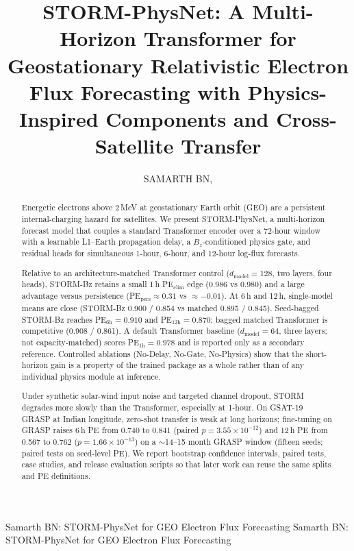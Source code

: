 \documentclass{ieeeaccess}
\begin{document}

\title{STORM-PhysNet: A Multi-Horizon Transformer for Geostationary Relativistic Electron Flux Forecasting with Physics-Inspired Components and Cross-Satellite Transfer}

\author{\uppercase{Samarth BN},
}
\address[1]{RV College of Engineering, Bengaluru, India (e-mail: samarthbn.ec25@rvce.edu.in)}
\markboth
{Samarth BN: STORM-PhysNet for GEO Electron Flux Forecasting}
{Samarth BN: STORM-PhysNet for GEO Electron Flux Forecasting}

\begin{abstract}
Energetic electrons above 2\,MeV at geostationary Earth orbit (GEO)
are a persistent internal-charging hazard for satellites. We present
STORM-PhysNet, a multi-horizon forecast model that couples a standard
Transformer encoder over a 72-hour window with a learnable L1--Earth
propagation delay, a \(B_z\)-conditioned physics gate, and residual
heads for simultaneous 1-hour, 6-hour, and 12-hour log-flux
forecasts.

Relative to an architecture-matched Transformer control
($d_{\mathrm{model}}=128$, two layers, four heads), STORM-Bz retains a small
1\,h PE$_{\mathrm{clim}}$ edge (0.986 vs 0.980) and a large advantage versus
persistence (PE$_{\mathrm{pers}} \approx 0.31$ vs $\approx -0.01$). At 6\,h and 12\,h, single-model
means are close (STORM-Bz 0.900 / 0.854 vs matched 0.895 / 0.845).
Seed-bagged STORM-Bz reaches PE$_{6\mathrm{h}} = 0.910$ and PE$_{12\mathrm{h}} = 0.870$;
bagged matched Transformer is competitive (0.908 / 0.861).
A default Transformer baseline ($d_{\mathrm{model}}=64$, three layers; not
capacity-matched) scores PE$_{1\mathrm{h}} = 0.978$ and is reported only as a
secondary reference. Controlled ablations (No-Delay, No-Gate,
No-Physics) show that the short-horizon gain is a property of the
trained package as a whole rather than of any individual physics
module at inference.

Under synthetic solar-wind input noise and targeted channel dropout,
STORM degrades more slowly than the Transformer, especially at
1-hour. On GSAT-19 GRASP at Indian longitude, zero-shot transfer is
weak at long horizons; fine-tuning on GRASP raises 6\,h PE from 0.740 to 0.841 (paired $p = 3.55 \times 10^{-12}$) and 12\,h PE from 0.567 to 0.762 ($p = 1.66 \times 10^{-13}$) on a $\sim$14--15 month GRASP window (fifteen seeds; paired tests on seed-level PE). We report bootstrap confidence intervals, paired tests, case studies, and release evaluation scripts so that later work can reuse the same splits and PE definitions.
\end{abstract}
\end{document}
